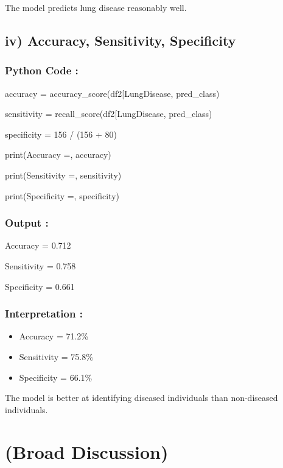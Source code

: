 \documentclass[
]{article}
\begin{document}
The model predicts lung disease reasonably well.

\subsection{\texorpdfstring{\textbf{iv) Accuracy, Sensitivity,
Specificity}}{iv) Accuracy, Sensitivity, Specificity}}\label{iv-accuracy-sensitivity-specificity}

\subsubsection{Python Code :}\label{python-code-6}

accuracy =
accuracy\_score(df2{[}\textquotesingle LungDisease\textquotesingle{]},
pred\_class)

sensitivity =
recall\_score(df2{[}\textquotesingle LungDisease\textquotesingle{]},
pred\_class)

specificity = 156 / (156 + 80)

print(\textquotesingle Accuracy =\textquotesingle, accuracy)

print(\textquotesingle Sensitivity =\textquotesingle, sensitivity)

print(\textquotesingle Specificity =\textquotesingle, specificity)

\subsubsection{Output :}\label{output-3}

Accuracy = 0.712

Sensitivity = 0.758

Specificity = 0.661

\subsubsection{Interpretation :}\label{interpretation-9}

\begin{itemize}
\item
  Accuracy = 71.2\%
\item
  Sensitivity = 75.8\%
\item
  Specificity = 66.1\%
\end{itemize}

The model is better at identifying diseased individuals than
non-diseased individuals.

\section{\texorpdfstring{\textbf{(Broad
Discussion)}}{(Broad Discussion)}}\label{broad-discussion}
\end{document}
